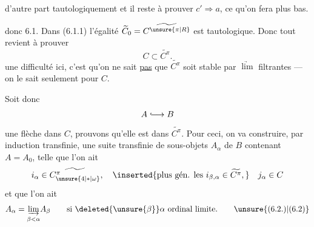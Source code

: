 d'autre part tautologiquement
et il reste à prouver $c'\Longrightarrow a$, ce qu'on fera plus bas.

 donc 6.1. Dans (6.1.1) l'égalité $\widetilde C_0=\widetilde{C^{\unsure{\pi|R}}}$ est tautologique. Donc tout revient à prouver
\[
 C\subset\widetilde{C^\pi}.
\]
une difficulté ici, c'est qu'on ne sait \uline{pas} que $\widetilde{C^\pi}$ soit stable par $\underrightarrow{\lim}$ filtrantes --- on le sait seulement pour $C$.

Soit donc
\[
 A\lhook\joinrel\longrightarrow B
\]
une flèche dans $C$, prouvons qu'elle est dans $\widetilde{C^\pi}$. Pour ceci, on  va construire, par induction transfinie, une suite transfinie  de sous-objets $A_\alpha$ de $B$ contenant $A=A_0$, 
telle que l'on ait
\[
 i_\alpha\in\widetilde{C^{\pi}_{\unsure{4|\ast|\omega}}},\quad
 \inserted{\text{plus gén. les }i_{\beta,\alpha}\in\widetilde{C^\pi},}\quad j_\alpha\in C
\]
et que l'on ait
\[
 A_\alpha=\underset{\beta<\alpha}{\underrightarrow{\lim}}A_\beta
 \qquad\text{si }\deleted{\unsure{\beta}}\alpha\text{ ordinal limite.}
 \tag*{\unsure{(6.2.)|(6.2)}}
\]
